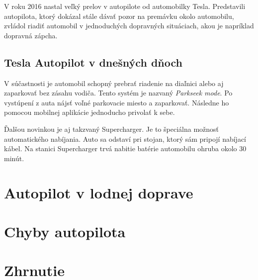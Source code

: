 \documentclass[10pt,twoside,slovak,a4paper]{article}
\begin{document}
V roku 2016 nastal veľký prelov v autopilote od automobilky Tesla. Predstavili autopilota, ktorý dokázal stále dávať pozor na premávku okolo automobilu, zvládol riadiť automobil v jednoduchých dopravných situáciach, akou je napríklad dopravná zápcha. \cite{TeslaAutopilot}

\subsection{Tesla Autopilot v dnešných dňoch}

V súčastnosti je automobil schopný prebrať riadenie na diaľnici alebo aj zaparkovať bez zásahu vodiča. Tento systém je nazvaný \emph{Parkseek mode}. Po vystúpení z auta nájsť voľné parkovacie miesto a zaparkovať. Následne ho pomocou mobilnej aplikácie jednoducho privolať k sebe. 

Ďalšou novinkou je aj takzvaný Supercharger. Je to špeciálna možnosť automatického nabíjania. Auto sa odstaví pri stojan, ktorý sám pripojí nabíjací kábel. Na stanici Supercharger trvá nabitie batérie automobilu ohruba okolo 30 minút. \cite{TeslaAutopilot}

\section{Autopilot v lodnej doprave} \label{AVLD}
\section{Chyby autopilota} \label{chyby}
\section{Zhrnutie}


 
\end{document}
